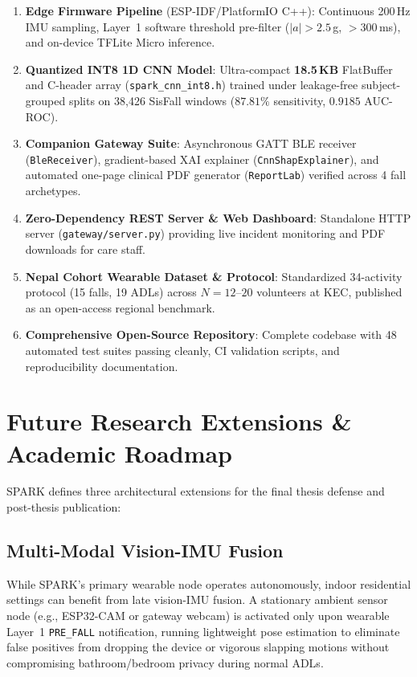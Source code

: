 \begin{enumerate}
    \item \textbf{Edge Firmware Pipeline} (ESP-IDF/PlatformIO C++): Continuous 200\,Hz IMU sampling, Layer~1 software threshold pre-filter ($|a|>2.5$\,g, $>300$\,ms), and on-device TFLite Micro inference.
    \item \textbf{Quantized INT8 1D CNN Model}: Ultra-compact \textbf{18.5\,KB} FlatBuffer and C-header array (\texttt{spark\_cnn\_int8.h}) trained under leakage-free subject-grouped splits on 38,426 SisFall windows ($87.81\%$ sensitivity, $0.9185$ AUC-ROC).
    \item \textbf{Companion Gateway Suite}: Asynchronous GATT BLE receiver (\texttt{BleReceiver}), gradient-based XAI explainer (\texttt{CnnShapExplainer}), and automated one-page clinical PDF generator (\texttt{ReportLab}) verified across 4 fall archetypes.
    \item \textbf{Zero-Dependency REST Server \& Web Dashboard}: Standalone HTTP server (\texttt{gateway/server.py}) providing live incident monitoring and PDF downloads for care staff.
    \item \textbf{Nepal Cohort Wearable Dataset \& Protocol}: Standardized 34-activity protocol (15 falls, 19 ADLs) across $N=12\text{--}20$ volunteers at KEC, published as an open-access regional benchmark.
    \item \textbf{Comprehensive Open-Source Repository}: Complete codebase with 48 automated test suites passing cleanly, CI validation scripts, and reproducibility documentation.
\end{enumerate}

\section{Future Research Extensions \& Academic Roadmap}

SPARK defines three architectural extensions for the final thesis defense and post-thesis publication:

\subsection{Multi-Modal Vision-IMU Fusion}

While SPARK's primary wearable node operates autonomously, indoor residential settings can benefit from late vision-IMU fusion. A stationary ambient sensor node (e.g., ESP32-CAM or gateway webcam) is activated only upon wearable Layer~1 \texttt{PRE\_FALL} notification, running lightweight pose estimation to eliminate false positives from dropping the device or vigorous slapping motions without compromising bathroom/bedroom privacy during normal ADLs.

